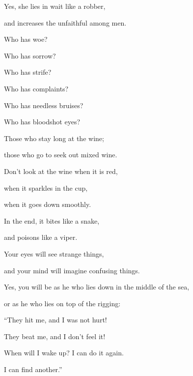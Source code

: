 {\par }{\Q {}Yes, she lies in wait like a robber,
\par }{\QB and increases the unfaithful among men.
\par }{\BB \par }{\Q {}Who has woe?
\par }{\QB Who has sorrow?
\par }{\QB Who has strife?
\par }{\QB Who has complaints?
\par }{\QB Who has needless bruises?
\par }{\QB Who has bloodshot eyes?
\par }{\Q {}Those who stay long at the wine;
\par }{\QB those who go to seek out mixed wine.
\par }{\Q {}Don’t look at the wine when it is red,
\par }{\QB when it sparkles in the cup,
\par }{\QB when it goes down smoothly.
\par }{\Q {}In the end, it bites like a snake,
\par }{\QB and poisons like a viper.
\par }{\Q {}Your eyes will see strange things,
\par }{\QB and your mind will imagine confusing things.
\par }{\Q {}Yes, you will be as he who lies down in the middle of the sea,
\par }{\QB or as he who lies on top of the rigging:
\par }{\Q {}“They hit me, and I was not hurt!
\par }{\QB They beat me, and I don’t feel it!
\par }{\QB When will I wake up? I can do it again.
\par }{\QB I can find another.”
\par }{\BB \par }
